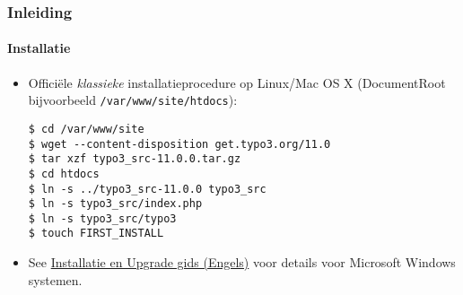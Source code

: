 %

\begin{frame}[fragile]
	\frametitle{Inleiding}
	\framesubtitle{Installatie}


	\begin{itemize}
		\item Offici\"ele \textit{klassieke} installatieprocedure op Linux/Mac OS X\newline
			(DocumentRoot bijvoorbeeld \texttt{/var/www/site/htdocs}):
\begin{lstlisting}
$ cd /var/www/site
$ wget --content-disposition get.typo3.org/11.0
$ tar xzf typo3_src-11.0.0.tar.gz
$ cd htdocs
$ ln -s ../typo3_src-11.0.0 typo3_src
$ ln -s typo3_src/index.php
$ ln -s typo3_src/typo3
$ touch FIRST_INSTALL
\end{lstlisting}

		\item See \href{https://docs.typo3.org/m/typo3/guide-installation/master/en-us/}{Installatie en Upgrade gids (Engels)}
			voor details voor Microsoft Windows systemen.

	\end{itemize}
\end{frame}

